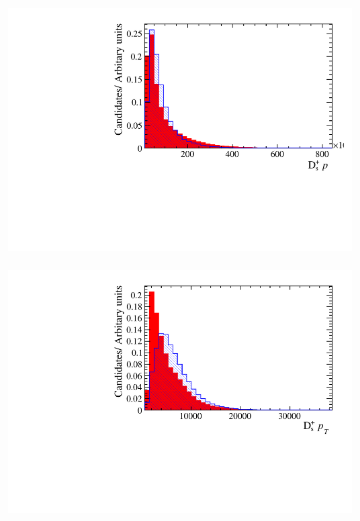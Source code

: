 \begin{figure}[!h]
   \centering
   \begin{subfigure}[t]{0.22\textwidth}
      \centering
      \includegraphics[width=1.0\textwidth]{figs/Selection/Ds_BDT_Var_Ds2KKPi_D_P.pdf}
   \end{subfigure}
   \begin{subfigure}[t]{0.22\textwidth}
      \centering
      \includegraphics[width=1.0\textwidth]{figs/Selection/Ds_BDT_Var_Ds2KKPi_D_PT.pdf}
   \end{subfigure}
   \begin{subfigure}[t]{0.22\textwidth}
      \centering

\end{subfigure}
\end{figure}
